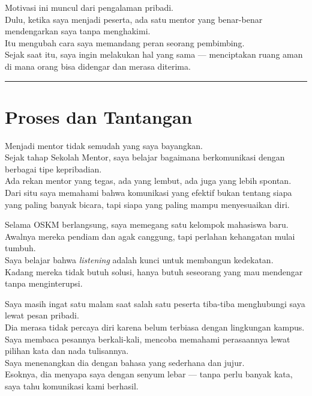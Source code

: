 \documentclass[
  letterpaper,
  DIV=11,
  numbers=noendperiod]{scrreprt}
\begin{document}
Motivasi ini muncul dari pengalaman pribadi.\\
Dulu, ketika saya menjadi peserta, ada satu mentor yang benar-benar
mendengarkan saya tanpa menghakimi.\\
Itu mengubah cara saya memandang peran seorang pembimbing.\\
Sejak saat itu, saya ingin melakukan hal yang sama --- menciptakan ruang
aman di mana orang bisa didengar dan merasa diterima.

\begin{center}\rule{0.5\linewidth}{0.5pt}\end{center}

\section{Proses dan Tantangan}\label{proses-dan-tantangan}

Menjadi mentor tidak semudah yang saya bayangkan.\\
Sejak tahap Sekolah Mentor, saya belajar bagaimana berkomunikasi dengan
berbagai tipe kepribadian.\\
Ada rekan mentor yang tegas, ada yang lembut, ada juga yang lebih
spontan.\\
Dari situ saya memahami bahwa komunikasi yang efektif bukan tentang
siapa yang paling banyak bicara, tapi siapa yang paling mampu
menyesuaikan diri.

Selama OSKM berlangsung, saya memegang satu kelompok mahasiswa baru.\\
Awalnya mereka pendiam dan agak canggung, tapi perlahan kehangatan mulai
tumbuh.\\
Saya belajar bahwa \emph{listening} adalah kunci untuk membangun
kedekatan.\\
Kadang mereka tidak butuh solusi, hanya butuh seseorang yang mau
mendengar tanpa menginterupsi.

Saya masih ingat satu malam saat salah satu peserta tiba-tiba
menghubungi saya lewat pesan pribadi.\\
Dia merasa tidak percaya diri karena belum terbiasa dengan lingkungan
kampus.\\
Saya membaca pesannya berkali-kali, mencoba memahami perasaannya lewat
pilihan kata dan nada tulisannya.\\
Saya menenangkan dia dengan bahasa yang sederhana dan jujur.\\
Esoknya, dia menyapa saya dengan senyum lebar --- tanpa perlu banyak
kata, saya tahu komunikasi kami berhasil.
\end{document}
